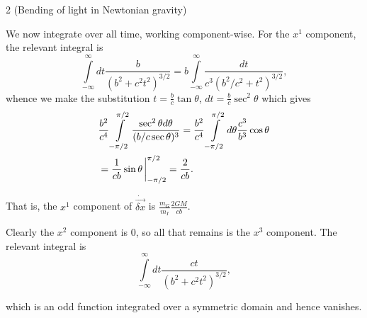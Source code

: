 \documentclass[11pt]{article}
\begin{document}
\begin{problem}{2 (Bending of light in Newtonian gravity)}
\begin{enumerate}[label=(\alph*)]
\begin{answer}
\begin{equation}
			      \end{equation}
            We now integrate over all time, working component-wise.
            For the \( x^1 \) component, the relevant integral is
            \begin{equation}
            \label{eq:47}
            \int\limits_{-\infty}^{\infty} dt \frac{b}{(b^2 + c^2t^2)^{3/2}} = b \int\limits_{-\infty}^{\infty} \frac{dt}{c^3 (b^2/c^2 + t^2)^{3/2}},
            \end{equation}
            whence we make the substitution \( t = \frac{b}{c}\tan\theta \), \( dt = \frac{b}{c} \sec^2\theta \) which gives
            \begin{align}
            \label{eq:48}
              &\frac{b^2}{c^4} \int\limits_{- \pi/2}^{\pi/2} \frac{\sec^2\theta d\theta}{(b/c\sec \theta)^3} = \frac{b^2}{c^{4}} \int\limits_{-\pi/2}^{\pi/2} d\theta \frac{c^3}{b^3} \cos \theta \\
              &= \frac{1}{cb} \sin\theta \eval_{-\pi/2}^{\pi/2} = \frac{2}{cb}.
            \end{align}

            That is, the \( x^1 \) component of \( \dot{\vec{\delta x}} \) is \( \frac{m_G}{m_I} \frac{2GM}{cb} \).

            Clearly the \( x^2 \) component is \( 0 \), so all that remains is the \( x^3 \) component.
            The relevant integral is
            \begin{equation}
            \label{eq:49}
            \int\limits_{-\infty}^{\infty} dt \frac{ct}{(b^2 + c^2t^2)^{3/2}},
            \end{equation}

            which is an odd function integrated over a symmetric domain and hence vanishes.


\end{answer}
\end{enumerate}
\end{problem}
\end{document}
